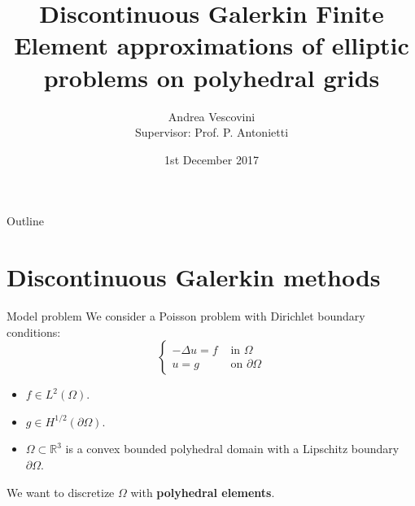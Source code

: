 \documentclass{beamer}
\title
[DG-FE approximations of elliptic problems on polyhedral grids]
{Discontinuous Galerkin Finite Element approximations of elliptic problems on
polyhedral grids}
\author[Andrea Vescovini]{Andrea Vescovini\\ \scriptsize Supervisor: Prof. P. 
Antonietti}
\institute{Politecnico di Milano}
\date{1st December 2017}
\begin{document}
\begin{frame}
	\centering
	\maketitle
\end{frame}
\begin{frame}{Outline}
	\tableofcontents
\end{frame}
\section[DG methods]{Discontinuous Galerkin methods}
\begin{frame}{Model problem}
	We consider a Poisson problem with Dirichlet boundary conditions:
	\begin{equation*}\begin{cases}
		-\Delta u= f& \mbox{ in } \Omega\\
		u = g& \mbox{ on } \partial \Omega
	\end{cases}\end{equation*}
	\begin{itemize}
		\item $f \in L^2(\Omega)$.
		\item $g \in H^{1/2}(\partial \Omega)$.
		\item $\Omega \subset \mathbb{R}^3$ is a convex bounded polyhedral 		
				domain with a Lipschitz boundary $\partial \Omega$.
	\end{itemize}
	\vspace*{0.5cm}
	\centering
	We want to discretize $\Omega$ with \textbf{polyhedral elements}.
\end{frame}
\end{document}
